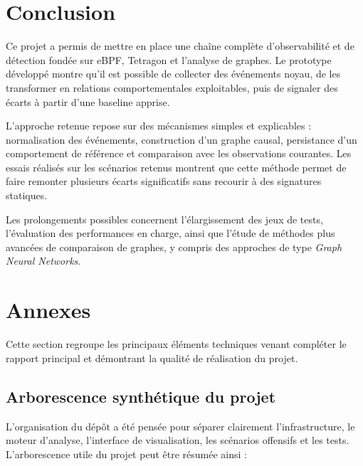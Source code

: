 \documentclass[a4paper,12pt]{article}
\begin{document}
\section{Conclusion}

Ce projet a permis de mettre en place une chaîne complète d'observabilité et de détection fondée sur eBPF, Tetragon et l'analyse de graphes. Le prototype développé montre qu'il est possible de collecter des événements noyau, de les transformer en relations comportementales exploitables, puis de signaler des écarts à partir d'une baseline apprise.

L'approche retenue repose sur des mécanismes simples et explicables : normalisation des événements, construction d'un graphe causal, persistance d'un comportement de référence et comparaison avec les observations courantes. Les essais réalisés sur les scénarios retenus montrent que cette méthode permet de faire remonter plusieurs écarts significatifs sans recourir à des signatures statiques.

Les prolongements possibles concernent l'élargissement des jeux de tests, l'évaluation des performances en charge, ainsi que l'étude de méthodes plus avancées de comparaison de graphes, y compris des approches de type \textit{Graph Neural Networks}.

\newpage
\appendix
\section{Annexes}

Cette section regroupe les principaux éléments techniques venant compléter le rapport principal et démontrant la qualité de réalisation du projet.

\subsection{Arborescence synthétique du projet}

L'organisation du dépôt a été pensée pour séparer clairement l'infrastructure, le moteur d'analyse, l'interface de visualisation, les scénarios offensifs et les tests. L'arborescence utile du projet peut être résumée ainsi :
\end{document}
